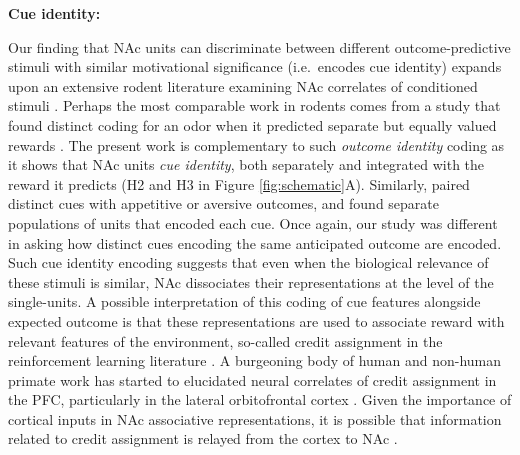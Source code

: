 \documentclass[11pt]{article}
\let\cite=\citep
\let\citeNP=\citealt
\begin{document}
{{\bf Cue identity:}

Our finding that NAc units can discriminate between different
outcome-predictive stimuli with similar motivational significance
(i.e.\ encodes cue identity) expands upon an extensive rodent
literature examining NAc correlates of conditioned stimuli
\cite{Ambroggi2008,Atallah2014,Bissonette2013,Cooch2015,Day2006,Dejean2017,Goldstein2012,Ishikawa2008,Lansink2012,McGinty2013,Nicola2004,Roesch2009a,Roitman2005,Saddoris2011,Setlow2003,Sugam2014,West2016,Yun2004}. Perhaps
the most comparable work in rodents comes from a study that found
distinct coding for an odor when it predicted separate but equally
valued rewards \cite{Cooch2015}. The present work is complementary to
such {\it outcome identity} coding as it shows that NAc units {\it cue
  identity}, both separately and integrated with the reward it
predicts (H2 and H3 in Figure \ref{fig:schematic}A). Similarly,
\citeNP{Setlow2003} paired distinct cues with appetitive or aversive
outcomes, and found separate populations of units that encoded each
cue. Once again, our study was different in asking how distinct cues
encoding the same anticipated outcome are encoded. Such cue identity
encoding suggests that even when the biological relevance of these
stimuli is similar, NAc dissociates their representations at the level
of the single-units. A possible interpretation of this coding of cue
features alongside expected outcome is that these representations are
used to associate reward with relevant features of the environment,
so-called credit assignment in the reinforcement learning literature
\cite{sutton1998}. A burgeoning body of human and non-human primate
work has started to elucidated neural correlates of credit assignment
in the PFC, particularly in the lateral orbitofrontal cortex
\cite{Akaishi2016,Asaad2017,Chau2015,Noonan2017}. Given the importance
of cortical inputs in NAc associative representations, it is possible
that information related to credit assignment is relayed from the
cortex to NAc \cite{Cooch2015,Ishikawa2008}.

}
\end{document}
